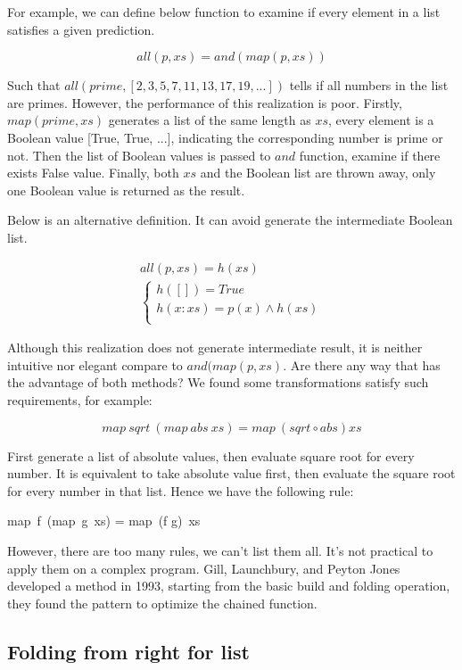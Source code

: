 \documentclass{article}
\begin{document}
For example, we can define below function to examine if every element in a list satisfies a given prediction\cite{GLPJ-1993}.

\[
all(p, xs) = and(map(p, xs))
\]

Such that $all(prime, [2, 3, 5, 7, 11, 13, 17, 19, ...])$ tells if all numbers in the list are primes. However, the performance of this realization is poor. Firstly, $map(prime, xs)$ generates a list of the same length as $xs$, every element is a Boolean value [True, True, ...], indicating the corresponding number is prime or not. Then the list of Boolean values is passed to $and$ function, examine if there exists False value. Finally, both $xs$ and the Boolean list are thrown away, only one Boolean value is returned as the result.

Below is an alternative definition. It can avoid generate the intermediate Boolean list.

\[
\begin{array}{l}
all(p, xs) = h(xs) \\
  \begin{cases}
  h([]) = True \\
  h(x:xs) = p(x) \land h(xs) \\
  \end{cases}
\end{array}
\]

Although this realization does not generate intermediate result, it is neither intuitive nor elegant compare to $and(map(p, xs)$. Are there any way that has the advantage of both methods? We found some transformations satisfy such requirements, for example:

\[
map\ sqrt\  (map\ abs\ xs) = map\ (sqrt \circ abs) xs
\]

First generate a list of absolute values, then evaluate square root for every number. It is equivalent to take absolute value first, then evaluate the square root for every number in that list. Hence we have the following rule:

\be
map\ f\ (map\ g\ xs) = map\ (f \circ g)\ xs
\ee

However, there are too many rules, we can't list them all. It's not practical to apply them on a complex program. Gill, Launchbury, and Peyton Jones developed a method in 1993, starting from the basic build and folding operation, they found the pattern to optimize the chained function.

\subsection{Folding from right for list}
\end{document}
